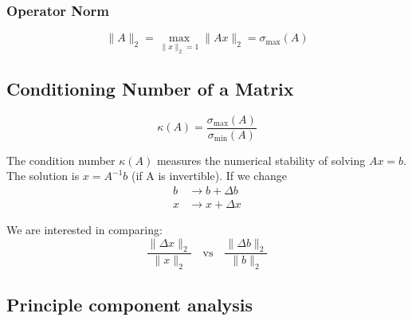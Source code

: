 \subsubsection{Operator Norm}
\begin{definition}
    \begin{equation*}
        \|A\|_2 = \max_{\|x\|_2 = 1} \|Ax\|_2 = \sigma_{\max}(A)
        \end{equation*}
\end{definition}

\subsection{Conditioning Number of a Matrix}
\begin{definition}
    \begin{equation*}
        \kappa(A) = \frac{\sigma_{\max}(A)}{\sigma_{\min}(A)}
        \end{equation*}
\end{definition}

\begin{intuition}
    The condition number \( \kappa(A) \) measures the numerical stability of solving \( A x = b \). 
    \vspace{1em}
    The solution is \( x = A^{-1} b \) (if A is invertible). If we change
    \begin{align*}
    b &\rightarrow b + \Delta b \\
    x &\rightarrow x + \Delta x
    \end{align*}

    We are interested in comparing:
    \begin{equation*}
    \frac{\|\Delta x\|_2}{\|x\|_2} \quad \text{vs} \quad \frac{\|\Delta b\|_2}{\|b\|_2}
    \end{equation*}
\end{intuition}

\subsection{Principle component analysis}